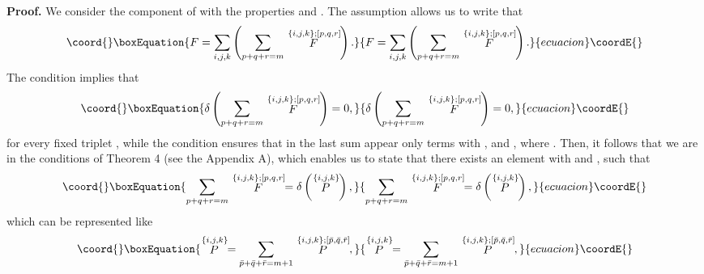 \documentclass[a4paper,12pt]{article}
\begin{document}
{\textbf{Proof.}} We consider the component \coordHE{}
of \coordHE{} with the properties \coordHE{} and \coordHE{}. The assumption \coordHE{} allows us to write that 
\begin{equation}\coord{}\boxEquation{
F=\sum\limits_{i,j,k}\left( \sum\limits_{p+q+r=m}\stackrel{\{i,j,k\};[p,q,r]
}{F}\right) .  \label{sp3.75}
}{
F=\sum\limits_{i,j,k}\left( \sum\limits_{p+q+r=m}\stackrel{\{i,j,k\};[p,q,r]
}{F}\right) .  }{ecuacion}\coordE{}\end{equation}
The condition \coordHE{} implies that 
\begin{equation}\coord{}\boxEquation{
\delta \left( \sum\limits_{p+q+r=m}\stackrel{\{i,j,k\};[p,q,r]}{F}\right) =0,
\label{sp3.76}
}{
\delta \left( \sum\limits_{p+q+r=m}\stackrel{\{i,j,k\};[p,q,r]}{F}\right) =0,
}{ecuacion}\coordE{}\end{equation}
for every fixed triplet \coordHE{}, while the condition \coordHE{} ensures that in the last sum appear only terms with \coordHE{}, \coordHE{} and \coordHE{}, where \coordHE{}. Then, it follows that we are
in the conditions of Theorem 4 (see the Appendix A), which enables us to
state that there exists an element \coordHE{} with \coordHE{} and \coordHE{}, such that 
\begin{equation}\coord{}\boxEquation{
\sum\limits_{p+q+r=m}\stackrel{\{i,j,k\};[p,q,r]}{F}=\delta \left( \stackrel{
\{i,j,k\}}{P}\right) ,  \label{sp3.77}
}{
\sum\limits_{p+q+r=m}\stackrel{\{i,j,k\};[p,q,r]}{F}=\delta \left( \stackrel{
\{i,j,k\}}{P}\right) ,  }{ecuacion}\coordE{}\end{equation}
which can be represented like 
\begin{equation}\coord{}\boxEquation{
\stackrel{\{i,j,k\}}{P}=\sum\limits_{\bar{p}+\bar{q}+\bar{r}=m+1}\stackrel{
\{i,j,k\};[\bar{p},\bar{q},\bar{r}]}{P},  \label{sp3.78}
}{
\stackrel{\{i,j,k\}}{P}=\sum\limits_{\bar{p}+\bar{q}+\bar{r}=m+1}\stackrel{
\{i,j,k\};[\bar{p},\bar{q},\bar{r}]}{P},  }{ecuacion}\coordE{}\end{equation}
\end{document}
